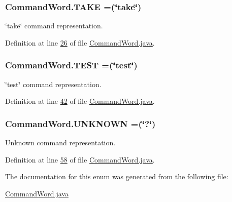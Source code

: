 \hypertarget{enumCommandWord_ac113629c0d6a8ebe3f4050a50d904a17}{
\subsubsection[{T\-A\-K\-E}]{\setlength{\rightskip}{0pt plus 5cm}Command\-Word.\-T\-A\-K\-E =(\char`\"{}take\char`\"{})}}\label{enumCommandWord_ac113629c0d6a8ebe3f4050a50d904a17}
\char`\"{}take\char`\"{} command representation. 

Definition at line \hyperlink{CommandWord_8java_source_l00026}{26} of file \hyperlink{CommandWord_8java_source}{Command\-Word.\-java}.

\hypertarget{enumCommandWord_a12071308fc3289269d190f8fe5dd95b4}{
\subsubsection[{T\-E\-S\-T}]{\setlength{\rightskip}{0pt plus 5cm}Command\-Word.\-T\-E\-S\-T =(\char`\"{}test\char`\"{})}}\label{enumCommandWord_a12071308fc3289269d190f8fe5dd95b4}
\char`\"{}test\char`\"{} command representation. 

Definition at line \hyperlink{CommandWord_8java_source_l00042}{42} of file \hyperlink{CommandWord_8java_source}{Command\-Word.\-java}.

\hypertarget{enumCommandWord_a7fac6077f2157eb151a67206fd39c3b9}{
\subsubsection[{U\-N\-K\-N\-O\-W\-N}]{\setlength{\rightskip}{0pt plus 5cm}Command\-Word.\-U\-N\-K\-N\-O\-W\-N =(\char`\"{}?\char`\"{})}}\label{enumCommandWord_a7fac6077f2157eb151a67206fd39c3b9}
Unknown command representation. 

Definition at line \hyperlink{CommandWord_8java_source_l00058}{58} of file \hyperlink{CommandWord_8java_source}{Command\-Word.\-java}.



The documentation for this enum was generated from the following file\-:\begin{DoxyCompactItemize}
\item 
\hyperlink{CommandWord_8java}{Command\-Word.\-java}\end{DoxyCompactItemize}
